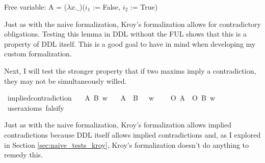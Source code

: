\begin{isabellebody}
{  Free variable:
    A = ($\lambda x. \_$)($i_1$ := False, $i_2$ := True) \color{black}%
}%
\endisatagproof
{\isafoldproof}%
%
\isadelimproof
%
\endisadelimproof
%
\begin{isamarkuptext}%
Just as with the naive formalization, Kroy's formalization allows for contradictory obligations. 
        Testing this lemma in DDL without the FUL shows that this is a property of DDL itself. This is a good goal to have in mind when 
        developing my custom formalization. 

        Next, I will test the stronger property that if two maxims imply a
        contradiction, they may not be simultaneously willed.%
\end{isamarkuptext}\isamarkuptrue%
\isamarkupfalse%
\ implied{\isacharunderscore}contradiction{\isacharcolon}\isanewline
\ \ \ A\ B\ w\isanewline
\ \ \ {\isachardoublequoteopen}{\isacharparenleft}{\isacharparenleft}A\ \isactrlbold {\isasymand}\ B{\isacharparenright}\ \isactrlbold {\isasymrightarrow}\ \isactrlbold {\isasymbottom}{\isacharparenright}\ w{\isachardoublequoteclose}\isanewline
\ \ \ {\isachardoublequoteopen}\isactrlbold {\isasymnot}\ {\isacharparenleft}O\ {\isacharbraceleft}A{\isacharbraceright}\ \isactrlbold {\isasymand}\ O\ {\isacharbraceleft}B{\isacharbraceright}{\isacharparenright}\ w{\isachardoublequoteclose}\isanewline
\ \ \isamarkupfalse%
\ {\isacharbrackleft}user{\isacharunderscore}axioms{\isacharcomma}\ falsify{\isacharbrackright}%
\isadelimproof
\ %
\endisadelimproof
%
\isatagproof
{}\isamarkupfalse%
\isanewline
%
%
\endisatagproof
{\isafoldproof}%
%
\isadelimproof
%
\endisadelimproof
%
\begin{isamarkuptext}%
Just as with the naive formalization, Kroy's formalization allows implied contradictions because 
        DDL itself allows implied contradictions and, as I explored in Section \ref{sec:naive_tests_kroy}, Kroy's 
        formalization doesn't do anything to remedy this. 


\end{isamarkuptext}
\end{isabellebody}
